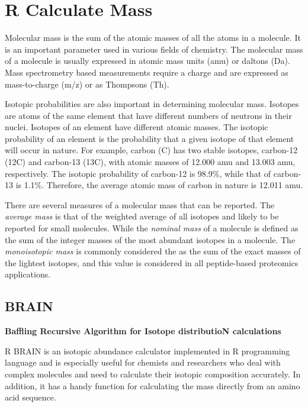 \documentclass[
]{book}
\begin{document}
\hypertarget{r-calculate-mass}{%
\section{R Calculate Mass}\label{r-calculate-mass}}

Molecular mass is the sum of the atomic masses of all the atoms in a molecule. It is an important parameter used in various fields of chemistry. The molecular mass of a molecule is usually expressed in atomic mass units (amu) or daltons (Da). Mass spectrometry based measurements require a charge and are expressed as mass-to-charge (m/z) or as Thompsons (Th).

Isotopic probabilities are also important in determining molecular mass. Isotopes are atoms of the same element that have different numbers of neutrons in their nuclei. Isotopes of an element have different atomic masses. The isotopic probability of an element is the probability that a given isotope of that element will occur in nature. For example, carbon (C) has two stable isotopes, carbon-12 (12C) and carbon-13 (13C), with atomic masses of 12.000 amu and 13.003 amu, respectively. The isotopic probability of carbon-12 is 98.9\%, while that of carbon-13 is 1.1\%. Therefore, the average atomic mass of carbon in nature is 12.011 amu.

There are several measures of a molecular mass that can be reported. The \emph{average mass} is that of the weighted average of all isotopes and likely to be reported for small molecules. While the \emph{nominal mass} of a molecule is defined as the sum of the integer masses of the most abundant isotopes in a molecule. The \emph{monoisotopic mass} is commonly considered the as the sum of the exact masses of the lightest isotopes, and this value is considered in all peptide-based proteomics applications.

\hypertarget{brain}{%
\subsection*{BRAIN}\label{brain}}

\textbf{Baffling Recursive Algorithm for Isotope distributioN calculations}

R BRAIN is an isotopic abundance calculator implemented in R programming language and is especially useful for chemists and researchers who deal with complex molecules and need to calculate their isotopic composition accurately. In addition, it has a handy function for calculating the mass directly from an amino acid sequence.
\end{document}
